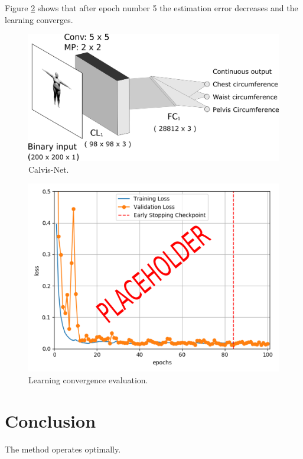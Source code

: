 \documentclass[runningheads, orivec]{llncs}
\begin{document}
Figure \ref{fig:learning_curve} shows that after epoch number 5 the estimation 
error decreases and the learning converges.
\begin{figure}[H]
	\begin{center}
		\includegraphics[width=\linewidth]{Calvis-Net.png}
	\end{center}
	\caption{Calvis-Net.}
	\label{fig:calvis_net}
\end{figure}

\begin{figure}[H]
	\begin{center}
		\includegraphics[width=\linewidth]{Training_val_loss.png}
	\end{center}
	\caption{Learning convergence evaluation.}
	\label{fig:learning_curve}
\end{figure}


\section{Conclusion}

The method operates optimally.
%
%
%


%
\end{document}
